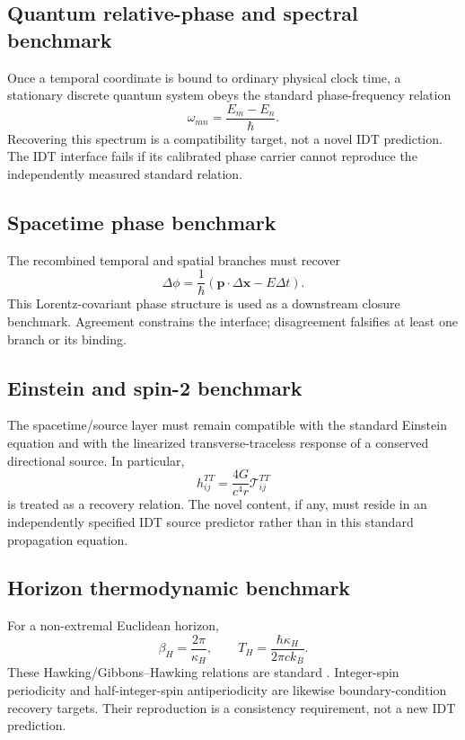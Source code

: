 \subsection{Quantum relative-phase and spectral benchmark}

Once a temporal coordinate is bound to ordinary physical clock time, a stationary discrete quantum system obeys the standard phase-frequency relation
\[
\boxed{
\omega_{mn}=\frac{E_m-E_n}{\hbar}.
}
\]
Recovering this spectrum is a compatibility target, not a novel IDT prediction. The IDT interface fails if its calibrated phase carrier cannot reproduce the independently measured standard relation.

\subsection{Spacetime phase benchmark}

The recombined temporal and spatial branches must recover
\[
\boxed{
\Delta\phi
=
\frac{1}{\hbar}
\left(\mathbf p\cdot\Delta\mathbf x-E\Delta t\right).
}
\]
This Lorentz-covariant phase structure is used as a downstream closure benchmark. Agreement constrains the interface; disagreement falsifies at least one branch or its binding.

\subsection{Einstein and spin-2 benchmark}

The spacetime/source layer must remain compatible with the standard Einstein equation \cite{Einstein1916} and with the linearized transverse-traceless response of a conserved directional source. In particular,
\[
h_{ij}^{TT}
=
\frac{4G}{c^4r}\mathcal T_{ij}^{TT}
\]
is treated as a recovery relation. The novel content, if any, must reside in an independently specified IDT source predictor rather than in this standard propagation equation.

\subsection{Horizon thermodynamic benchmark}

For a non-extremal Euclidean horizon,
\[
\beta_H=\frac{2\pi}{\kappa_H},
\qquad
\boxed{
T_H=\frac{\hbar\kappa_H}{2\pi c k_B}.
}
\]
These Hawking/Gibbons--Hawking relations are standard \cite{Hawking1975,GibbonsHawking1977}. Integer-spin periodicity and half-integer-spin antiperiodicity are likewise boundary-condition recovery targets. Their reproduction is a consistency requirement, not a new IDT prediction.

